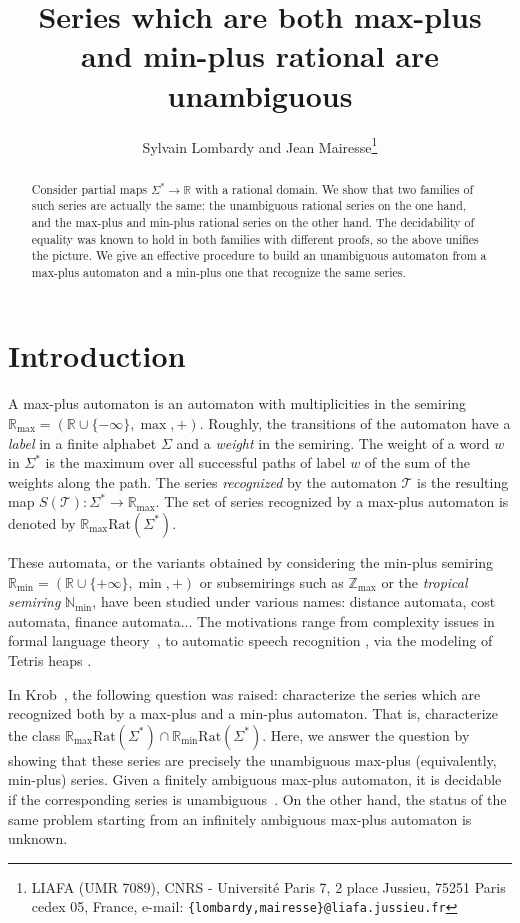 \documentclass{article}
\def\cT{{\mathcal T}}
\newcommand{\N} {\ensuremath{\mathbb{N}}}
\newcommand{\Z} {\ensuremath{\mathbb{Z}}}
\newcommand{\R} {\ensuremath{\mathbb{R}}}
\newcommand{\Nmin} {\N_{\min}}
\newcommand{\Zmax} {\Z_{\max}}
\newcommand{\Rmin} {\R_{\min}}
\newcommand{\Rmax} {\R_{\max}}
\newcommand{\1}{\mathbb{1}}
\newcommand{\0}{\mathbb{0}}
\def\Rat{\text{Rat}}
\def\ab{\Sigma}
\begin{document}
\title{Series which are both max-plus and min-plus rational are
  unambiguous}
\author{Sylvain Lombardy and Jean Mairesse\thanks{LIAFA (UMR 7089), CNRS - Universit\'e Paris 7,
2 place Jussieu, 75251 Paris cedex 05, France,
e-mail: {\small{\tt \{lombardy,mairesse\}@liafa.jussieu.fr}}}}

\maketitle

\begin{abstract}
Consider partial maps $\Sigma^* \longrightarrow \R$ with a rational
domain. We show that two families of such series are actually the
same: the unambiguous rational series on the one hand, and 
the max-plus and min-plus rational series on the other hand.
The decidability of equality was known to hold in both families with
different proofs, so the above unifies the picture. 
We give an effective procedure to build an unambiguous automaton from
a max-plus automaton and a min-plus one that recognize the same series.
\end{abstract}

\section{Introduction}

A max-plus automaton is an automaton with multiplicities in the
semiring $\Rmax= (\R\cup\{-\infty\},\max,+)$. Roughly, the transitions
of the automaton have a {\em label} in a finite alphabet $\Sigma$ and a {\em
  weight} in the semiring. The weight of a word $w$ in $\ab^*$ is the maximum over all
successful paths of label $w$ of the sum of the weights along the path. 
The series {\em recognized} by the
automaton $\cT$ is the resulting map $S(\cT): \Sigma^* \rightarrow
\Rmax$. The set of series recognized by a max-plus automaton 
is denoted by $\Rmax\Rat(\Sigma^*)$. 

These automata, or the variants obtained by considering the min-plus
semi\-ring $\Rmin= (\R\cup\{+\infty\},\min,+)$ or subsemirings such as 
$\Zmax$ or the {\em tropical semiring} $\Nmin$, have been studied
under various names: distance automata, cost automata, finance
automata... 
The motivations range from complexity issues in formal language
theory~\cite{simo88}, 
to automatic speech recognition \cite{mohr}, via the modeling of Tetris
heaps \cite{GaMa98b}. 

In Krob~\cite{krob94}, the following question was raised: characterize the
series which are recognized both by a max-plus and a min-plus
automaton. That is, characterize the class $\Rmax\Rat(\Sigma^*)\cap
\Rmin\Rat(\Sigma^*)$. Here, we answer the question by showing that these
series are precisely the unambiguous max-plus (equivalently, min-plus)
series. Given a finitely ambiguous max-plus automaton, it is decidable if the
corresponding series is unambiguous~\cite{KLMP04}. On the other hand,
the status of the same problem
starting from an infinitely ambiguous max-plus automaton is unknown. 
\end{document}

